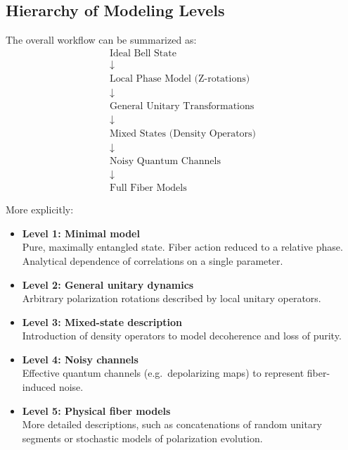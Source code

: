 \documentclass[a4paper]{article}
\begin{document}
\subsection{Hierarchy of Modeling Levels}

The overall workflow can be summarized as:
\[
\begin{array}{c}
\text{Ideal Bell State} \\
\downarrow \\
\text{Local Phase Model (Z-rotations)} \\
\downarrow \\
\text{General Unitary Transformations} \\
\downarrow \\
\text{Mixed States (Density Operators)} \\
\downarrow \\
\text{Noisy Quantum Channels} \\
\downarrow \\
\text{Full Fiber Models}
\end{array}
\]

More explicitly:

\begin{itemize}
    \item \textbf{Level 1: Minimal model} \\
    Pure, maximally entangled state. Fiber action reduced to a relative phase. Analytical dependence of correlations on a single parameter.

    \item \textbf{Level 2: General unitary dynamics} \\
    Arbitrary polarization rotations described by local unitary operators.

    \item \textbf{Level 3: Mixed-state description} \\
    Introduction of density operators to model decoherence and loss of purity.

    \item \textbf{Level 4: Noisy channels} \\
    Effective quantum channels (e.g.\ depolarizing maps) to represent fiber-induced noise.

    \item \textbf{Level 5: Physical fiber models} \\
    More detailed descriptions, such as concatenations of random unitary segments or stochastic models of polarization evolution.
\end{itemize}
\end{document}
